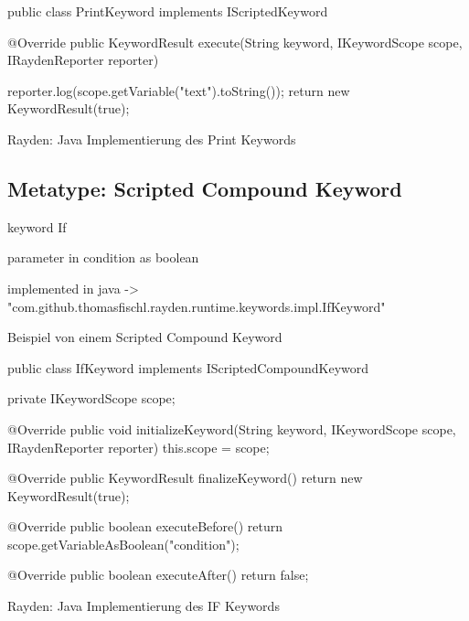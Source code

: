 \begin{program}
\begin{JavaCode}
public class PrintKeyword implements IScriptedKeyword {

	@Override
	public KeywordResult execute(String keyword, 
			IKeywordScope scope, IRaydenReporter reporter) {
			
		reporter.log(scope.getVariable("text").toString());
		return new KeywordResult(true);
	}
}
\end{JavaCode}
\caption{Rayden: Java Implementierung des Print Keywords}
\label{prog:scriptedKeyword}
\end{program}



\todo


\subsection{Metatype: Scripted Compound Keyword}

\begin{program}
\begin{JavaCode}
keyword If { 
	parameter in condition as boolean

	implemented in java -> "com.github.thomasfischl.rayden.runtime.keywords.impl.IfKeyword"
}
\end{JavaCode}
\caption{Beispiel von einem Scripted Compound Keyword}
\label{prog:ifKeywordImpl}
\end{program}

\begin{program}
\begin{JavaCode}
public class IfKeyword implements IScriptedCompoundKeyword {

  private IKeywordScope scope;

  @Override
  public void initializeKeyword(String keyword, IKeywordScope scope, IRaydenReporter reporter) {
    this.scope = scope;
  }

  @Override
  public KeywordResult finalizeKeyword() {
    return new KeywordResult(true);
  }

  @Override
  public boolean executeBefore() {
    return scope.getVariableAsBoolean("condition");
  }

  @Override
  public boolean executeAfter() {
    return false;
  }
}
\end{JavaCode}
\caption{Rayden: Java Implementierung des IF Keywords}
\label{prog:ifKeywordImpl}
\end{program}

